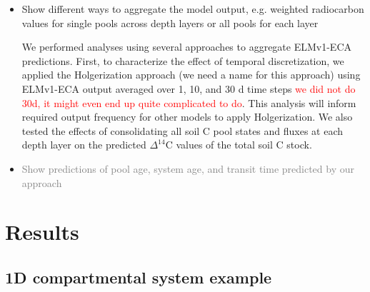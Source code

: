 \documentclass[11pt,a4paper]{article}
\newcommand{\red}[1]{\textcolor{red}{#1}}
\newcommand{\gray}[1]{\textcolor{gray}{#1}}
\begin{document}
\begin{itemize}
    
    \item Show different ways to aggregate the model output, e.g. weighted radiocarbon values for single pools across depth layers or all pools for each layer
    
    We performed analyses using several approaches to aggregate ELMv1-ECA predictions. First, to characterize the effect of temporal discretization, we applied the Holgerization approach (we need a name for this approach) using ELMv1-ECA output averaged over 1, 10, and 30 d time steps \red{we did not do 30d, it might even end up quite complicated to do}. This analysis will inform required output frequency for other models to apply Holgerization. We also tested the effects of consolidating all soil C pool states and fluxes at each depth layer on the predicted $\Delta^{14}$C values of the total soil C stock. 
    \item \gray{Show predictions of pool age, system age, and transit time predicted by our approach}
\end{itemize}    

\section{Results}

\subsection{1D compartmental system example}
        
\end{document}
